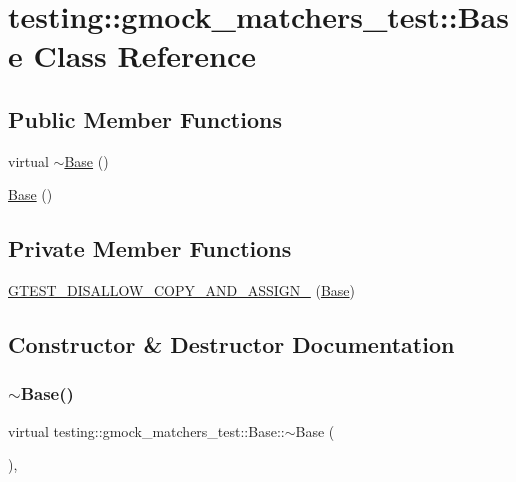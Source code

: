 \hypertarget{classtesting_1_1gmock__matchers__test_1_1_base}{}\section{testing\+::gmock\+\_\+matchers\+\_\+test\+::Base Class Reference}
\label{classtesting_1_1gmock__matchers__test_1_1_base}
\subsection*{Public Member Functions}
\begin{DoxyCompactItemize}
\item 
virtual \mbox{\hyperlink{classtesting_1_1gmock__matchers__test_1_1_base_ab02c73411d19b28ccb847c65bc782bb6}{$\sim$\+Base}} ()
\item 
\mbox{\hyperlink{classtesting_1_1gmock__matchers__test_1_1_base_ab3b2127992b81455804462897de44516}{Base}} ()
\end{DoxyCompactItemize}
\subsection*{Private Member Functions}
\begin{DoxyCompactItemize}
\item 
\mbox{\hyperlink{classtesting_1_1gmock__matchers__test_1_1_base_a7b0d0cb9935410e18425968f7135fa91}{G\+T\+E\+S\+T\+\_\+\+D\+I\+S\+A\+L\+L\+O\+W\+\_\+\+C\+O\+P\+Y\+\_\+\+A\+N\+D\+\_\+\+A\+S\+S\+I\+G\+N\+\_\+}} (\mbox{\hyperlink{class_base}{Base}})
\end{DoxyCompactItemize}


\subsection{Constructor \& Destructor Documentation}
\mbox{\label{classtesting_1_1gmock__matchers__test_1_1_base_ab02c73411d19b28ccb847c65bc782bb6}} 
\subsubsection{\texorpdfstring{$\sim$Base()}{~Base()}}
{\footnotesize\ttfamily virtual testing\+::gmock\+\_\+matchers\+\_\+test\+::\+Base\+::$\sim$\+Base (\begin{DoxyParamCaption}{ }\end{DoxyParamCaption})\hspace{0.3cm}{\ttfamily [inline]}, {\ttfamily [virtual]}}

